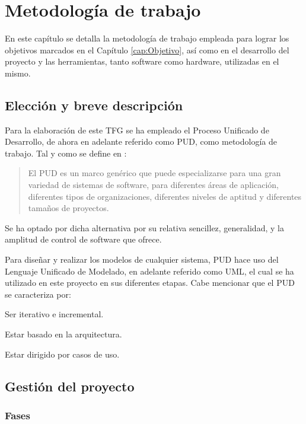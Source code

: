 \chapter{Metodología de trabajo}
\label{cap:Metodologia}

En este capítulo se detalla la metodología de trabajo empleada para lograr los objetivos marcados en el Capítulo \ref{cap:Objetivo}, así como en el desarrollo del proyecto  y las herramientas, tanto software como hardware, utilizadas en el mismo.

\section{Elección y breve descripción}
\label{sec:Elección}

Para la elaboración de este TFG se ha empleado el Proceso Unificado de Desarrollo, de ahora en adelante referido como PUD, como metodología de trabajo. Tal y como se define en \cite{PUD2017}:

\begin{quote}
    El PUD es un marco genérico que puede especializarse para una gran variedad de sistemas de software, para diferentes áreas de aplicación, diferentes tipos de organizaciones, diferentes niveles de aptitud y diferentes tamaños de proyectos.
\end{quote}

Se ha optado por dicha alternativa por su relativa sencillez, generalidad, y la amplitud de control de software que ofrece.

Para diseñar y realizar los modelos de cualquier sistema, PUD hace uso del Lenguaje Unificado de Modelado, en adelante referido como UML, el cual se ha utilizado en este proyecto en sus diferentes etapas. Cabe mencionar que el PUD se caracteriza por:
\begin{compactitem}
    \item Ser iterativo e incremental.
    \item Estar basado en la arquitectura.
    \item Estar dirigido por casos de uso.
\end{compactitem}

\section{Gestión del proyecto}
\label{sec:Gestion}

\subsection{Fases}
\label{subsec:Fases}

